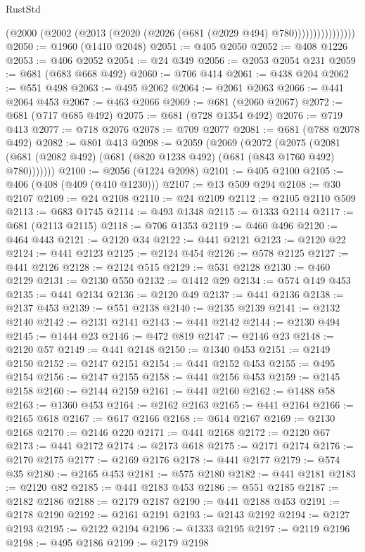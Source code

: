 \begin{lexlean}{RustStd}
\begin{coremodule}
{\begin{coremodule}
{{{{{{{{{{{{{{{{{{{{{{{{{{                        (@2000 (@2002 (@2013 (@2020 (@2026 (@681 (@2029 @494) @780))))))))))))))))
@2050 := @1960 (@1410 @2048)
@2051 := @405 @2050
@2052 := @408 @1226
@2053 := @406 @2052
@2054 := @24 @349
@2056 := @2053 @2054 @231
@2059 := @681 (@683 @668 @492)
@2060 := @706 @414
@2061 := @438 @204
@2062 := @551 @498
@2063 := @495 @2062
@2064 := @2061 @2063
@2066 := @441 @2064 @453
@2067 := @463 @2066
@2069 := @681 (@2060 @2067)
@2072 := @681 (@717 @685 @492)
@2075 := @681 (@728 @1354 @492)
@2076 := @719 @413
@2077 := @718 @2076
@2078 := @709 @2077
@2081 := @681 (@788 @2078 @492)
@2082 := @801 @413
@2098 := @2059
    (@2069
      (@2072
        (@2075 (@2081 (@681 (@2082 @492) (@681 (@820 @1238 @492) (@681 (@843 @1760 @492) @780)))))))
@2100 := @2056 (@1224 @2098)
@2101 := @405 @2100
@2105 := @406 (@408 (@409 (@410 @1230)))
@2107 := @13 @509 @294
@2108 := @30 @2107
@2109 := @24 @2108
@2110 := @24 @2109
@2112 := @2105 @2110 @509
@2113 := @683 @1745
@2114 := @493 @1348
@2115 := @1333 @2114
@2117 := @681 (@2113 @2115)
@2118 := @706 @1353
@2119 := @460 @496
@2120 := @464 @443
@2121 := @2120 @34
@2122 := @441 @2121
@2123 := @2120 @22
@2124 := @441 @2123
@2125 := @2124 @454
@2126 := @578 @2125
@2127 := @441 @2126
@2128 := @2124 @515
@2129 := @531 @2128
@2130 := @460 @2129
@2131 := @2130 @550
@2132 := @1412 @29
@2134 := @574 @149 @453
@2135 := @441 @2134
@2136 := @2120 @49
@2137 := @441 @2136
@2138 := @2137 @453
@2139 := @551 @2138
@2140 := @2135 @2139
@2141 := @2132 @2140
@2142 := @2131 @2141
@2143 := @441 @2142
@2144 := @2130 @494
@2145 := @1444 @23
@2146 := @472 @819
@2147 := @2146 @23
@2148 := @2120 @57
@2149 := @441 @2148
@2150 := @1340 @453
@2151 := @2149 @2150
@2152 := @2147 @2151
@2154 := @441 @2152 @453
@2155 := @495 @2154
@2156 := @2147 @2155
@2158 := @441 @2156 @453
@2159 := @2145 @2158
@2160 := @2144 @2159
@2161 := @441 @2160
@2162 := @1488 @58
@2163 := @1360 @453
@2164 := @2162 @2163
@2165 := @441 @2164
@2166 := @2165 @618
@2167 := @617 @2166
@2168 := @614 @2167
@2169 := @2130 @2168
@2170 := @2146 @220
@2171 := @441 @2168
@2172 := @2120 @67
@2173 := @441 @2172
@2174 := @2173 @618
@2175 := @2171 @2174
@2176 := @2170 @2175
@2177 := @2169 @2176
@2178 := @441 @2177
@2179 := @574 @35
@2180 := @2165 @453
@2181 := @575 @2180
@2182 := @441 @2181
@2183 := @2120 @82
@2185 := @441 @2183 @453
@2186 := @551 @2185
@2187 := @2182 @2186
@2188 := @2179 @2187
@2190 := @441 @2188 @453
@2191 := @2178 @2190
@2192 := @2161 @2191
@2193 := @2143 @2192
@2194 := @2127 @2193
@2195 := @2122 @2194
@2196 := @1333 @2195
@2197 := @2119 @2196
@2198 := @495 @2186
@2199 := @2179 @2198
}}}}}}}}}}}}}}}}}}}}}}}}}}
\end{coremodule}}
\end{coremodule}
\end{lexlean}
